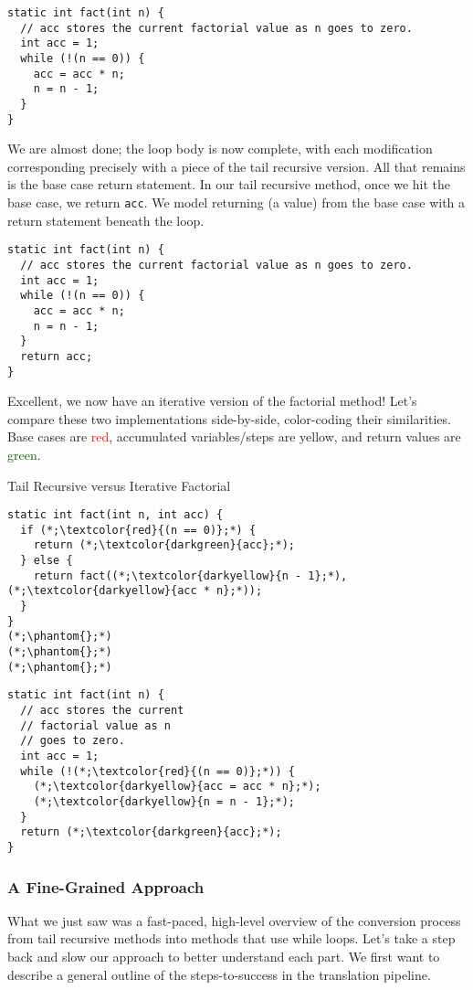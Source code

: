 \begin{lstlisting}[language=MyJava]
static int fact(int n) {
  // acc stores the current factorial value as n goes to zero.
  int acc = 1;
  while (!(n == 0)) {
    acc = acc * n;
    n = n - 1;
  }
}
\end{lstlisting}

We are almost done; the loop body is now complete, with each modification corresponding precisely with a piece of the tail recursive version. 
All that remains is the base case return statement. 
In our tail recursive method, once we hit the base case, we return \texttt{acc}. 
We model returning (a value) from the base case with a return statement beneath the loop.

\begin{lstlisting}[language=MyJava]
static int fact(int n) {
  // acc stores the current factorial value as n goes to zero.
  int acc = 1;
  while (!(n == 0)) {
    acc = acc * n;
    n = n - 1;
  }
  return acc;
}
\end{lstlisting}

Excellent, we now have an iterative version of the factorial method! 
Let's compare these two implementations side-by-side, color-coding their similarities. 
Base cases are \textcolor{red}{red}, accumulated variables/steps are \textcolor{darkyellow}{yellow}, and return values are \textcolor{darkgreen}{green}. 

\begin{clrr}[]{Tail Recursive versus Iterative Factorial}
\begin{lstlisting}[language=MyJavaNF]
static int fact(int n, int acc) {
  if (*;\textcolor{red}{(n == 0)};*) {
    return (*;\textcolor{darkgreen}{acc};*);
  } else {
    return fact((*;\textcolor{darkyellow}{n - 1};*), (*;\textcolor{darkyellow}{acc * n};*));
  }
}
(*;\phantom{};*)
(*;\phantom{};*)
(*;\phantom{};*)
\end{lstlisting}
\tcblower
\begin{lstlisting}[language=MyJavaNF]
static int fact(int n) {
  // acc stores the current
  // factorial value as n 
  // goes to zero.
  int acc = 1;
  while (!(*;\textcolor{red}{(n == 0)};*)) {
    (*;\textcolor{darkyellow}{acc = acc * n};*);
    (*;\textcolor{darkyellow}{n = n - 1};*);
  }
  return (*;\textcolor{darkgreen}{acc};*);
}
\end{lstlisting}
\end{clrr}

\subsubsection*{A Fine-Grained Approach}
What we just saw was a fast-paced, high-level overview of the conversion process from tail recursive methods into methods that use while loops. 
Let's take a step back and slow our approach to better understand each part. 
We first want to describe a general outline of the steps-to-success in the translation pipeline. 

